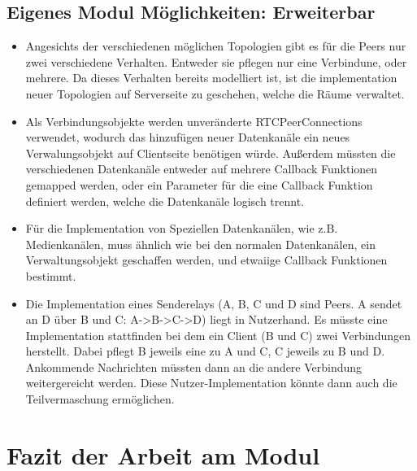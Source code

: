 \subsection{Eigenes Modul Möglichkeiten: Erweiterbar}
\begin{itemize}
\item
Angesichts der verschiedenen möglichen Topologien gibt es für die Peers nur zwei verschiedene Verhalten. 
Entweder sie pflegen nur eine Verbindune, oder mehrere.
Da dieses Verhalten bereits modelliert ist, ist die implementation neuer Topologien auf Serverseite zu geschehen, welche die Räume verwaltet.

\item
Als Verbindungsobjekte werden unveränderte RTCPeerConnections verwendet, wodurch das hinzufügen neuer Datenkanäle ein neues Verwalungsobjekt auf Clientseite benötigen würde.
Außerdem müssten die verschiedenen Datenkanäle entweder auf mehrere Callback Funktionen gemapped werden, oder ein Parameter für die eine Callback Funktion definiert werden, welche die Datenkanäle logisch trennt.

\item
Für die Implementation von Speziellen Datenkanälen, wie z.B. Medienkanälen, muss ähnlich wie bei den normalen Datenkanälen, ein Verwaltungsobjekt geschaffen werden, und etwaiige Callback Funktionen bestimmt.

\item
Die Implementation eines Senderelays (A, B, C und D sind Peers. A sendet an D über B und C: A->B->C->D) liegt in Nutzerhand. Es müsste eine Implementation stattfinden bei dem ein Client (B und C) zwei Verbindungen herstellt. 
Dabei pflegt B jeweils eine zu A und C, C jeweils zu B und D.
Ankommende Nachrichten müssten dann an die andere Verbindung weitergereicht werden.
Diese Nutzer-Implementation könnte dann auch die Teilvermaschung ermöglichen.
\end{itemize}



\section{Fazit der Arbeit am Modul}
